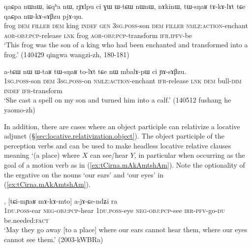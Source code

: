 \begin{exe}
\ex \label{ex:tWsNaR.tAkAlAt}
\gll qaɕpa nɯnɯ, iɕqʰa nɯ, rɟɤlpu ci ɣɯ ɯ-tɕɯ nɯnɯ, nɤkinɯ, tɯ-sŋaʁ tɤ-kɤ-lɤt tɕe qaɕpa nɯ-kɤ-sɤβzu pjɤ-ŋu. \\
frog \textsc{dem} \textsc{filler} \textsc{dem} king \textsc{indef} \textsc{gen} \textsc{3sg}.\textsc{poss}-son \textsc{dem} \textsc{filler} \textsc{nmlz}:\textsc{action}-enchant \textsc{aor}-\textsc{obj}:\textsc{pcp}-release \textsc{lnk} frog \textsc{aor}-\textsc{obj}:\textsc{pcp}-transform \textsc{ifr}.\textsc{ipfv}-be \\
\glt `This frog was the son of a king who had been enchanted and transformed into a frog.' (140429 qingwa wangzi-zh,  180-181) 	
\end{exe}

\begin{exe}
\ex \label{ex:WtaR.tWsNaR.tolAt}
\gll  a-tɕɯ nɯ ɯ-taʁ tɯ-sŋaʁ to-lɤt tɕe nɯ mbalɤ-pɯ ci ɲɤ-sɤβzu. \\
\textsc{1sg}.\textsc{poss}-son \textsc{dem} \textsc{3sg}.\textsc{poss}-on \textsc{nmlz}:\textsc{action}-enchant \textsc{ifr}-release \textsc{lnk} \textsc{dem} bull-\textsc{dim} \textsc{indef} \textsc{ifr}-transform \\
\glt `She cast a spell on my son and turned him into a calf.' (140512 fushang he yaomo-zh)
\end{exe}
 
In addition, there are cases where an object participle can relativize a locative adjunct (§\ref{sec:locative.relativization.object}). The object participle of the perception verbs  and  can be used to make headless locative relative clauses meaning `(a place) where $X$ can see/hear $Y$, in particular when occurring as the goal of a motion verb as in (\ref{ex:tCirna.mAkAmtshAm}). Note the optionality of the ergative on the nouns  `our ears' and  `our eyes' in (\ref{ex:tCirna.mAkAmtshAm}). 

\begin{exe}
\ex \label{ex:tCirna.mAkAmtshAm}
, [tɕi-mɲaʁ mɤ-kɤ-mto] a-jɤ-ɕe-ndʑi ra \\
\textsc{1du}.\textsc{poss}-ear \textsc{neg}-\textsc{obj}:\textsc{pcp}-hear \textsc{1du}.\textsc{poss}-eye \textsc{neg}-\textsc{obj}:\textsc{pcp}-see \textsc{irr}-\textsc{pfv}-go-\textsc{du} be.needed:\textsc{fact} \\
\glt  `May they go away [to a place] where our ears cannot hear them, where our eyes cannot see them.' (2003-kWBRa)
\end{exe}

